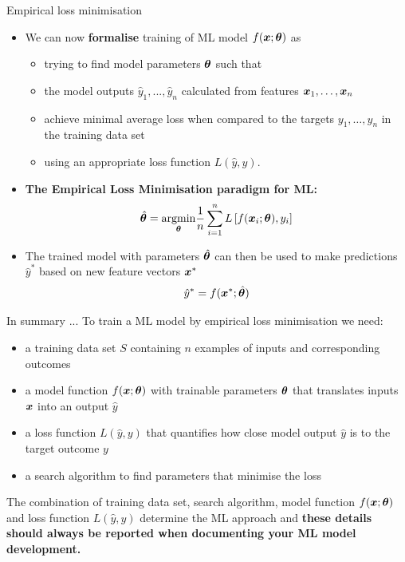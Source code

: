 \documentclass{beamer}
\begin{document}
\begin{frame}{Empirical loss minimisation}
\begin{itemize}
\item We can now \textbf{formalise} training of ML model \(f(\boldsymbol{x};\boldsymbol{\theta})\) as
\begin{itemize}
\item trying to find model parameters \(\boldsymbol{\theta}\) such that
\item the model outputs \(\hat{y}_1, ..., \hat{y}_n\) calculated from features \(\boldsymbol{x}_1, \dots, \boldsymbol{x}_n\) 
\item achieve minimal average loss when compared to the targets \(y_1, \dots, y_n\) in the training data set
\item using an appropriate loss function \(L(\hat{y}, y)\).
\end{itemize}
\item \textbf{The Empirical Loss Minimisation paradigm for ML:}
\[\hat{\boldsymbol{\theta}} = \underset{\boldsymbol{\theta}}{\mathrm{argmin}}\frac1n\sum_{i=1}^n L\left[f(\boldsymbol{x}_i; \boldsymbol{\theta}), y_i\right]\]
\item The trained model with parameters \(\hat{\boldsymbol{\theta}}\) can then be used to make predictions \(\hat{y}^*\) based on new feature vectors \(\boldsymbol{x}^*\)
\[\hat{y}^* = f(\boldsymbol{x}^*; \hat{\boldsymbol{\theta}})\]
\end{itemize}
\end{frame}

\begin{frame}{In summary ...}
To train a ML model by empirical loss minimisation we need:
\begin{itemize}
\item a training data set \(S\) containing \(n\) examples of inputs and corresponding outcomes
\item a model function \(f(\boldsymbol{x};\boldsymbol{\theta})\) with trainable parameters \(\boldsymbol{\theta}\) that translates inputs \(\boldsymbol{x}\) into an output \(\hat{y}\)
\item a loss function \(L(\hat{y},y)\) that quantifies how close model output \(\hat{y}\) is to the target outcome \(y\)
\item a search algorithm to find parameters that minimise the loss 
\end{itemize}
The combination of training data set, search algorithm, model function \(f(\boldsymbol{x};\boldsymbol{\theta})\) and loss function \(L(\hat{y},y)\) determine the ML approach and \textbf{these details should always be reported when documenting your ML model development.}
\end{frame}
\end{document}
